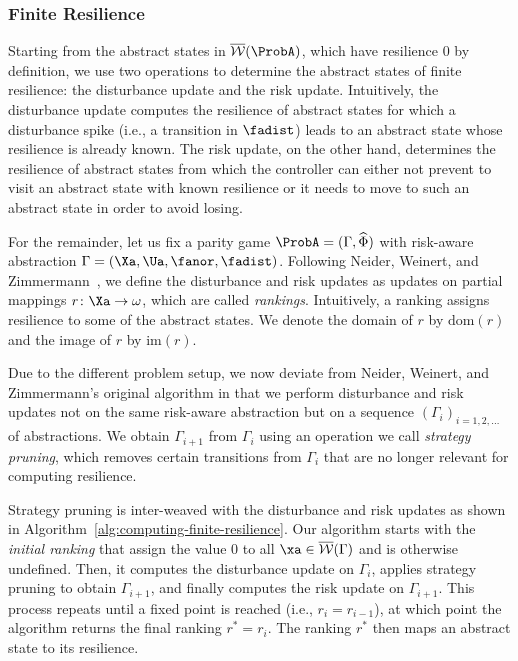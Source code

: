 \subsubsection{Finite Resilience}
Starting from the abstract states in $\overline{\mathcal W}(\ProbA)$, which have resilience $0$ by definition, we use two operations to determine the abstract states of finite resilience: the disturbance update and the risk update.
Intuitively, the disturbance update computes the resilience of abstract states for which a disturbance spike (i.e., a transition in $\fadist$) leads to an abstract state whose resilience is already known.
The risk update, on the other hand, determines the resilience of abstract states from which the controller can either not prevent to visit an abstract state with known resilience or it needs to move to such an abstract state in order to avoid losing.

For the remainder, let us fix a parity game $\ProbA = (\Gamma, \widehat{\Phi})$ with risk-aware abstraction $\Gamma=(\Xa,\Ua,\fanor,\fadist)$.
Following Neider, Weinert, and Zimmermann~\cite{DBLP:conf/csl/NeiderW018}, we define the disturbance and risk updates as updates on partial mappings $r \colon \Xa \to \omega$, which are called \emph{rankings}.
Intuitively, a ranking assigns resilience to some of the abstract states.
We denote the domain of $r$ by $\mathrm{dom}(r)$ and the image of $r$ by $\mathrm{im}(r)$.

Due to the different problem setup, we now deviate from Neider, Weinert, and Zimmermann's original algorithm in that we perform disturbance and risk updates not on the same risk-aware abstraction but on a sequence $(\Gamma_i)_{i=1, 2, \ldots}$ of abstractions.
We obtain $\Gamma_{i+1}$ from $\Gamma_i$ using an operation we call \emph{strategy pruning}, which removes certain transitions from $\Gamma_i$ that are no longer relevant for computing resilience.

Strategy pruning is inter-weaved with the disturbance and risk updates as shown in Algorithm~\ref{alg:computing-finite-resilience}.
Our algorithm starts with the \emph{initial ranking} that assign the value $0$ to all $\xa \in \overline{\mathcal W}(\Gamma)$ and is otherwise undefined.
Then, it computes the disturbance update on $\Gamma_i$, applies strategy pruning to obtain $\Gamma_{i+1}$, and finally computes the risk update on $\Gamma_{i+1}$.
This process repeats until a fixed point is reached (i.e., $r_i = r_{i-1}$), at which point the algorithm returns the final ranking $r^\ast = r_i$.
The ranking $r^\ast$ then maps an abstract state to its resilience.

